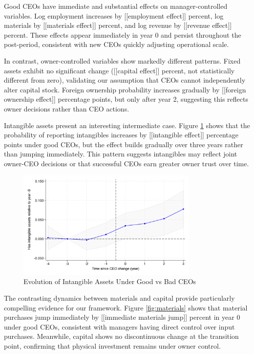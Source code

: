 \documentclass[11pt,a4paper]{article}
\begin{document}
Good CEOs have immediate and substantial effects on manager-controlled variables. Log employment increases by [[employment effect]] percent, log materials by [[materials effect]] percent, and log revenue by [[revenue effect]] percent. These effects appear immediately in year 0 and persist throughout the post-period, consistent with new CEOs quickly adjusting operational scale.



In contrast, owner-controlled variables show markedly different patterns. Fixed assets exhibit no significant change ([[capital effect]] percent, not statistically different from zero), validating our assumption that CEOs cannot independently alter capital stock. Foreign ownership probability increases gradually by [[foreign ownership effect]] percentage points, but only after year 2, suggesting this reflects owner decisions rather than CEO actions.

Intangible assets present an interesting intermediate case. Figure \ref{fig:intangibles} shows that the probability of reporting intangibles increases by [[intangible effect]] percentage points under good CEOs, but the effect builds gradually over three years rather than jumping immediately. This pattern suggests intangibles may reflect joint owner-CEO decisions or that successful CEOs earn greater owner trust over time.

\begin{figure}[htbp]
\centering
\includegraphics[width=0.8\textwidth]{figure/event_study_has_intangible.pdf}
\caption{Evolution of Intangible Assets Under Good vs Bad CEOs}
\label{fig:intangibles}
\end{figure}

The contrasting dynamics between materials and capital provide particularly compelling evidence for our framework. Figure \ref{fig:materials} shows that material purchases jump immediately by [[immediate materials jump]] percent in year 0 under good CEOs, consistent with managers having direct control over input purchases. Meanwhile, capital shows no discontinuous change at the transition point, confirming that physical investment remains under owner control.
\end{document}
